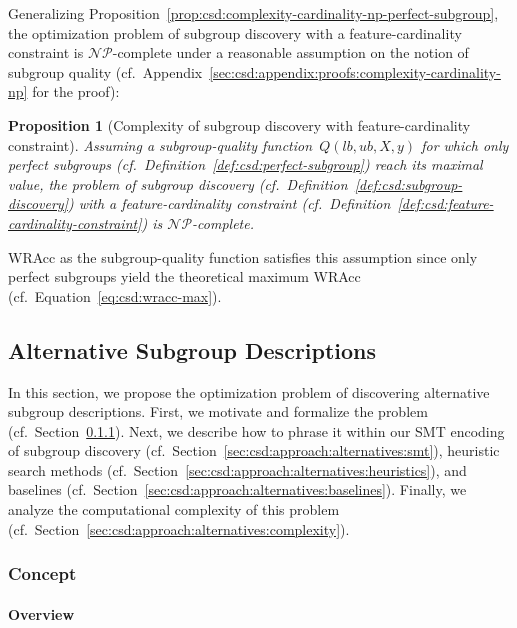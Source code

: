 \documentclass{article}
\newtheorem{proposition}{Proposition}
\theoremstyle{definition}
\begin{document}
Generalizing Proposition~\ref{prop:csd:complexity-cardinality-np-perfect-subgroup}, the optimization problem of subgroup discovery with a feature-cardinality constraint is $\mathcal{NP}$-complete under a reasonable assumption on the notion of subgroup quality (cf.~Appendix~\ref{sec:csd:appendix:proofs:complexity-cardinality-np} for the proof):
%
\begin{proposition}[Complexity of subgroup discovery with feature-cardinality constraint]
	Assuming a subgroup-quality function~$Q(\mathit{lb}, \mathit{ub}, X, y)$ for which only perfect subgroups (cf.~Definition~\ref{def:csd:perfect-subgroup}) reach its maximal value,
	the problem of subgroup discovery (cf.~Definition~\ref{def:csd:subgroup-discovery}) with a feature-cardinality constraint (cf.~Definition~\ref{def:csd:feature-cardinality-constraint}) is $\mathcal{NP}$-complete.
	\label{prop:csd:complexity-cardinality-np}
\end{proposition}
%
WRAcc as the subgroup-quality function satisfies this assumption since only perfect subgroups yield the theoretical maximum WRAcc (cf.~Equation~\ref{eq:csd:wracc-max}).

\subsection{Alternative Subgroup Descriptions}
\label{sec:csd:approach:alternatives}

In this section, we propose the optimization problem of discovering alternative subgroup descriptions.
First, we motivate and formalize the problem (cf.~Section~\ref{sec:csd:approach:alternatives:concept}).
Next, we describe how to phrase it within our SMT encoding of subgroup discovery (cf.~Section~\ref{sec:csd:approach:alternatives:smt}), heuristic search methods (cf.~Section~\ref{sec:csd:approach:alternatives:heuristics}), and baselines (cf.~Section~\ref{sec:csd:approach:alternatives:baselines}).
Finally, we analyze the computational complexity of this problem (cf.~Section~\ref{sec:csd:approach:alternatives:complexity}).

\subsubsection{Concept}
\label{sec:csd:approach:alternatives:concept}

\paragraph{Overview}
\end{document}
